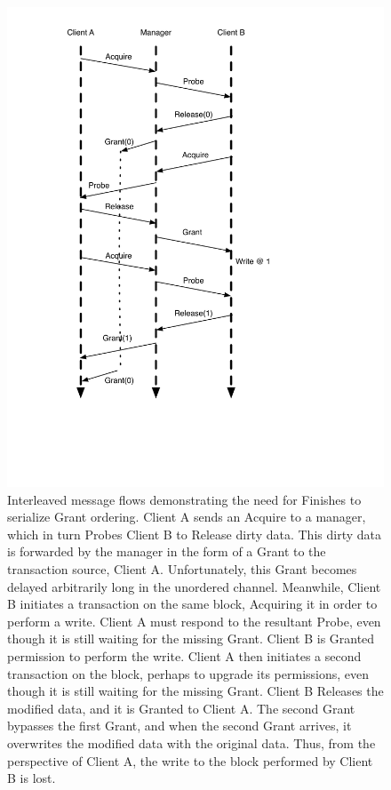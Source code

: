 \begin{figure}[!p]
\centering
\includegraphics[width=0.5\columnwidth]{tilelink/figures/unordered.pdf}
\caption[Interleaved message flows demonstrating the need for Finishes to serialize Grant ordering.]{
Interleaved message flows demonstrating the need for Finishes to serialize Grant ordering.
Client A sends an Acquire to a manager, which in turn Probes Client B to Release dirty data.
This dirty data is forwarded by the manager in the form of a Grant to the transaction source, Client A.
Unfortunately, this Grant becomes delayed arbitrarily long in the unordered channel. 
Meanwhile, Client B initiates a transaction on the same block, Acquiring it in order to perform a write.
Client A must respond to the resultant Probe, even though it is still waiting for the missing Grant.
Client B is Granted permission to perform the write.
Client A then initiates a second transaction on the block, perhaps to upgrade its permissions, even though it is still waiting for the missing Grant.
Client B Releases the modified data, and it is Granted to Client A.
The second Grant bypasses the first Grant, and when the second Grant arrives, it overwrites the modified data with the original data.
Thus, from the perspective of Client A, the write to the block performed by Client B is lost.
}
\label{fig:unordered}
\end{figure}

